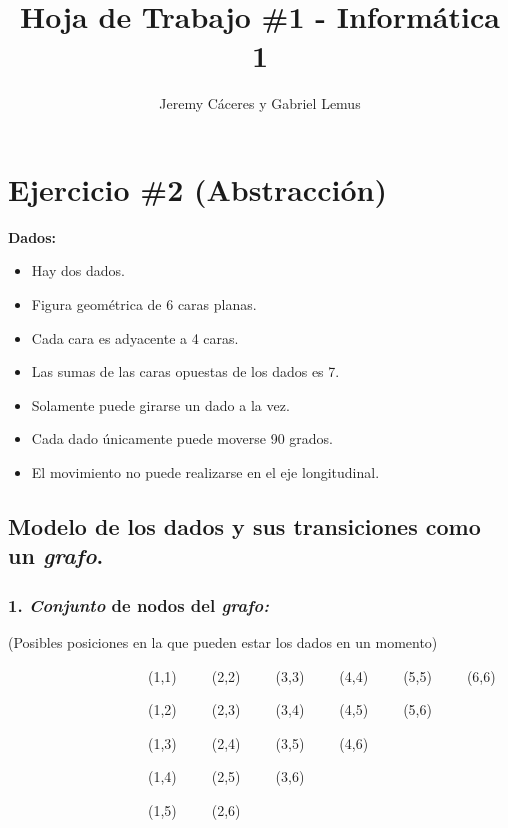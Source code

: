 \documentclass[11pt,letterpaper]{article}
\begin{document}
\title{Hoja de Trabajo \#1 - Informática 1}
\author{Jeremy Cáceres y Gabriel Lemus}
\date{}
\maketitle

\section*{\textbf{Ejercicio \#2 (Abstracción)}}
\textbf{Dados:}

\begin{itemize}
\item Hay dos dados.
\item Figura geométrica de 6 caras planas.
\item Cada cara es adyacente a 4 caras.
\item Las sumas de las caras opuestas de los dados es 7.
\item Solamente puede girarse un dado a la vez.
\item Cada dado únicamente puede moverse 90 grados.
\item El movimiento no puede realizarse en el eje longitudinal.
\end{itemize}

\subsection*{\textbf{Modelo de los dados y sus transiciones como un \emph{grafo}.}}
\subsubsection*{\textbf{1. \emph{Conjunto} de nodos del \emph{grafo:}}}

(Posibles posiciones en la que pueden estar los dados en un momento)
\bigskip

\ \ \ \ \ \ \ \ \ \ \ \ \ \ \ \ \ \ \ \ (1,1)\ \ \ \ \ (2,2)\ \ \ \ \ (3,3)\ \ \ \ \ (4,4)\ \ \ \ \ (5,5)\ \ \ \ \ (6,6)

\ \ \ \ \ \ \ \ \ \ \ \ \ \ \ \ \ \ \ \ (1,2)\ \ \ \ \ (2,3)\ \ \ \ \ (3,4)\ \ \ \ \ (4,5)\ \ \ \ \ (5,6)

\ \ \ \ \ \ \ \ \ \ \ \ \ \ \ \ \ \ \ \ (1,3)\ \ \ \ \ (2,4)\ \ \ \ \ (3,5)\ \ \ \ \ (4,6)

\ \ \ \ \ \ \ \ \ \ \ \ \ \ \ \ \ \ \ \ (1,4)\ \ \ \ \ (2,5)\ \ \ \ \ (3,6)

\ \ \ \ \ \ \ \ \ \ \ \ \ \ \ \ \ \ \ \ (1,5)\ \ \ \ \ (2,6)
\end{document}
